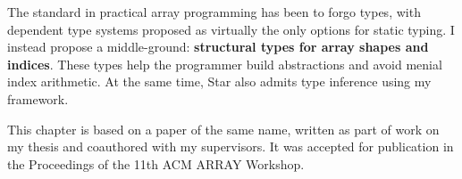 The standard in practical array programming has been to forgo types, with dependent type systems proposed as virtually the only options for static typing. I instead propose a middle-ground: \textbf{structural types for array shapes and indices}. These types help the programmer build abstractions and avoid menial index arithmetic. At the same time, Star also admits type inference using my framework.

This chapter is based on a paper of the same name, written as part of work on my thesis and coauthored with my supervisors. It was accepted for publication in the Proceedings of the 11th ACM ARRAY Workshop. 